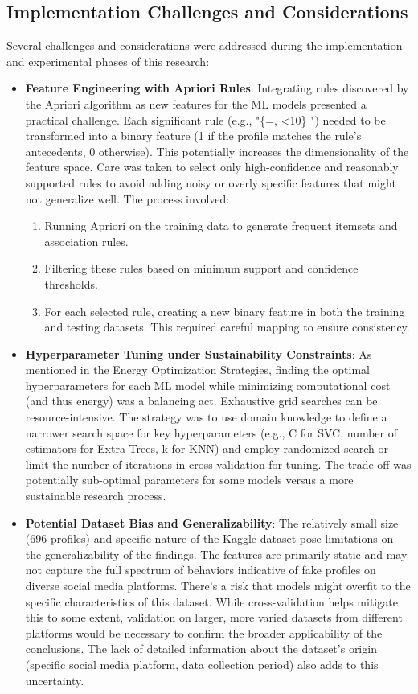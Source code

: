 \documentclass[conference]{IEEEtran}
\begin{document}
\subsection{Implementation Challenges and Considerations}
Several challenges and considerations were addressed during the implementation and experimental phases of this research:
\begin{itemize}
    \item \textbf{Feature Engineering with Apriori Rules}: Integrating rules discovered by the Apriori algorithm as new features for the ML models presented a practical challenge. Each significant rule (e.g., "\{=, <10\} \Rightarrow {}") needed to be transformed into a binary feature (1 if the profile matches the rule's antecedents, 0 otherwise). This potentially increases the dimensionality of the feature space. Care was taken to select only high-confidence and reasonably supported rules to avoid adding noisy or overly specific features that might not generalize well. The process involved:
        \begin{enumerate}
            \item Running Apriori on the training data to generate frequent itemsets and association rules.
            \item Filtering these rules based on minimum support and confidence thresholds.
            \item For each selected rule, creating a new binary feature in both the training and testing datasets. This required careful mapping to ensure consistency.
        \end{enumerate}
    \item \textbf{Hyperparameter Tuning under Sustainability Constraints}: As mentioned in the Energy Optimization Strategies, finding the optimal hyperparameters for each ML model while minimizing computational cost (and thus energy) was a balancing act. Exhaustive grid searches can be resource-intensive. The strategy was to use domain knowledge to define a narrower search space for key hyperparameters (e.g., C for SVC, number of estimators for Extra Trees, k for KNN) and employ randomized search or limit the number of iterations in cross-validation for tuning. The trade-off was potentially sub-optimal parameters for some models versus a more sustainable research process.
    \item \textbf{Potential Dataset Bias and Generalizability}: The relatively small size (696 profiles) and specific nature of the Kaggle dataset \cite{b5} pose limitations on the generalizability of the findings. The features are primarily static and may not capture the full spectrum of behaviors indicative of fake profiles on diverse social media platforms. There's a risk that models might overfit to the specific characteristics of this dataset. While cross-validation helps mitigate this to some extent, validation on larger, more varied datasets from different platforms would be necessary to confirm the broader applicability of the conclusions. The lack of detailed information about the dataset's origin (specific social media platform, data collection period) also adds to this uncertainty.

\end{itemize}
\end{document}
